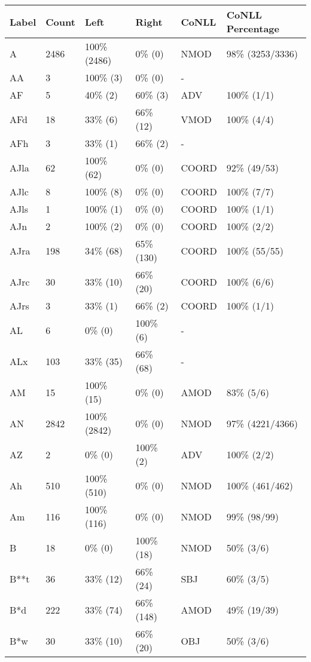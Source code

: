 \begin{figure*}
\begin{tabular}{|l|l|l|l||l|l|}
\hline
Label & Count & Left & Right & CoNLL & CoNLL Percentage\\ 
\hline
 A & 2486 & 100\% (2486) & 0\% (0) & NMOD & 98\% (3253/3336) \\ 
\hline
 AA & 3 & 100\% (3) & 0\% (0) & - &  \\ 
\hline
 AF & 5 & 40\% (2) & 60\% (3) & ADV & 100\% (1/1) \\ 
\hline
 AFd & 18 & 33\% (6) & 66\% (12) & VMOD & 100\% (4/4) \\ 
\hline
 AFh & 3 & 33\% (1) & 66\% (2) & - &  \\ 
\hline
 AJla & 62 & 100\% (62) & 0\% (0) & COORD & 92\% (49/53) \\ 
\hline
 AJlc & 8 & 100\% (8) & 0\% (0) & COORD & 100\% (7/7) \\ 
\hline
 AJls & 1 & 100\% (1) & 0\% (0) & COORD & 100\% (1/1) \\ 
\hline
 AJn & 2 & 100\% (2) & 0\% (0) & COORD & 100\% (2/2) \\ 
\hline
 AJra & 198 & 34\% (68) & 65\% (130) & COORD & 100\% (55/55) \\ 
\hline
 AJrc & 30 & 33\% (10) & 66\% (20) & COORD & 100\% (6/6) \\ 
\hline
 AJrs & 3 & 33\% (1) & 66\% (2) & COORD & 100\% (1/1) \\ 
\hline
 AL & 6 & 0\% (0) & 100\% (6) & - &  \\ 
\hline
 ALx & 103 & 33\% (35) & 66\% (68) & - &  \\ 
\hline
 AM & 15 & 100\% (15) & 0\% (0) & AMOD & 83\% (5/6) \\ 
\hline
 AN & 2842 & 100\% (2842) & 0\% (0) & NMOD & 97\% (4221/4366) \\ 
\hline
 AZ & 2 & 0\% (0) & 100\% (2) & ADV & 100\% (2/2) \\ 
\hline
 Ah & 510 & 100\% (510) & 0\% (0) & NMOD & 100\% (461/462) \\ 
\hline
 Am & 116 & 100\% (116) & 0\% (0) & NMOD & 99\% (98/99) \\ 
\hline
 B & 18 & 0\% (0) & 100\% (18) & NMOD & 50\% (3/6) \\ 
\hline
 B**t & 36 & 33\% (12) & 66\% (24) & SBJ & 60\% (3/5) \\ 
\hline
 B*d & 222 & 33\% (74) & 66\% (148) & AMOD & 49\% (19/39) \\ 
\hline
 B*w & 30 & 33\% (10) & 66\% (20) & OBJ & 50\% (3/6) \\ 

\end{tabular}
\end{figure*}
